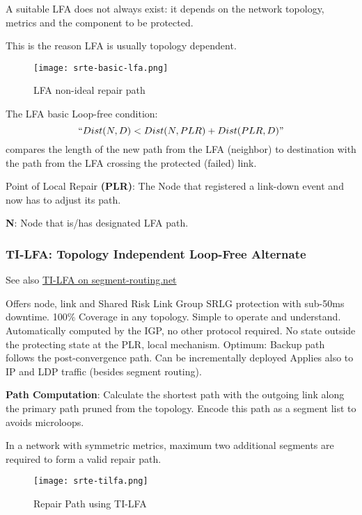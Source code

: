  
A suitable LFA does not always exist: it depends on the network topology, metrics and the component to be protected.

This is the reason LFA is usually topology dependent.

\begin{figure}
    \centering
    \texttt{[image: srte-basic-lfa.png]}
    \caption{LFA non-ideal repair path}
\end{figure}

\vspace{5mm} \noindent
The LFA basic Loop-free condition:
\emph{\[ ``Dist(N,D) < Dist(N,PLR) + Dist(PLR,D)" \]}
compares the length of the new path from the LFA (neighbor) to destination with the path from the LFA crossing the protected (failed) link.  

\vspace{5mm}
Point of Local Repair \textbf{(PLR)}: The Node that registered a link-down event and now has to adjust its path.

\textbf{N}: Node that is/has designated LFA path.

\subsubsection{TI-LFA: Topology Independent Loop-Free Alternate}

See also \href{https://www.segment-routing.net/tutorials/2016-09-27-topology-independent-lfa-ti-lfa/}{TI-LFA on segment-routing.net}

Offers node, link and Shared Risk Link Group SRLG protection with sub-50ms downtime. 100\% Coverage in any topology. Simple to operate and understand.
 Automatically computed by the IGP, no other protocol required.
 No state outside the protecting state at the PLR, local mechanism.
 Optimum: Backup path follows the post-convergence path. 
 Can be incrementally deployed
 Applies also to IP and LDP traffic (besides segment routing).

 
\vspace{5mm} \noindent
\textbf{Path Computation}: Calculate the shortest path with the outgoing link along the primary path pruned from the topology. 
Encode this path as a segment list to avoids microloops.

In a network with symmetric metrics, maximum two additional segments are required to form a valid repair path.

\begin{figure}[h]
    \centering
    \texttt{[image: srte-tilfa.png]}
    \caption{Repair Path using TI-LFA}
\end{figure}


